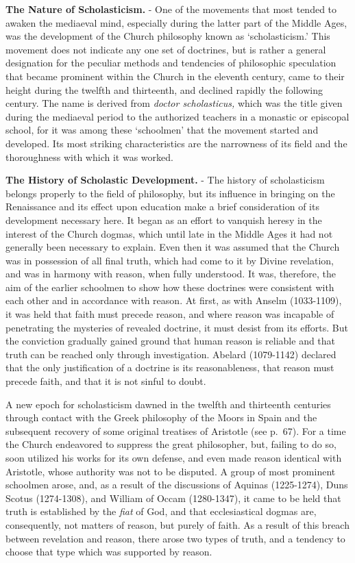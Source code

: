 \documentclass[]{book}
\begin{document}
\textbf{The Nature of Scholasticism.} - One of the movements that most tended to awaken the mediaeval mind, especially during the latter part of the Middle Ages, was the development of the Church philosophy known as `scholasticism.' This movement does not indicate any one set of doctrines, but is rather a general designation for the peculiar methods and tendencies of philosophic speculation that became prominent within the Church in the eleventh century, came to their height during the twelfth and thirteenth, and declined rapidly the following century. The name is derived from \emph{doctor scholasticus,} which was the title given during the mediaeval period to the authorized teachers in a monastic or episcopal school, for it was among these `schoolmen' that the movement started and developed. Its most striking characteristics are the narrowness of its field and the thoroughness with which it was worked.

\textbf{The History of Scholastic Development.} - The history of scholasticism belongs properly to the field of philosophy, but its influence in bringing on the Renaissance and its effect upon education make a brief consideration of its development necessary here. It began as an effort to vanquish heresy in the interest of the Church dogmas, which until late in the Middle Ages it had not generally been necessary to explain. Even then it was assumed that the Church was in possession of all final truth, which had come to it by Divine revelation, and was in harmony with reason, when fully understood. It was, therefore, the aim of the earlier schoolmen to show how these doctrines were consistent with each other and in accordance with reason. At first, as with Anselm (1033-1109), it was held that faith must precede reason, and where reason was incapable of penetrating the mysteries of revealed doctrine, it must desist from its efforts. But the conviction gradually gained ground that human reason is reliable and that truth can be reached only through investigation. Abelard (1079-1142) declared that the only justification of a doctrine is its reasonableness, that reason must precede faith, and that it is not sinful to doubt.

A new epoch for scholasticism dawned in the twelfth and thirteenth centuries through contact with the Greek philosophy of the Moors in Spain and the subsequent recovery of some original treatises of Aristotle (see p.~67). For a time the Church endeavored to suppress the great philosopher, but, failing to do so, soon utilized his works for its own defense, and even made reason identical with Aristotle, whose authority was not to be disputed. A group of most prominent schoolmen arose, and, as a result of the discussions of Aquinas (1225-1274), Duns Scotus (1274-1308), and William of Occam (1280-1347), it came to be held that truth is established by the \emph{fiat} of God, and that ecclesiastical dogmas are, consequently, not matters of reason, but purely of faith. As a result of this breach between revelation and reason, there arose two types of truth, and a tendency to choose that type which was supported by reason.
\end{document}
